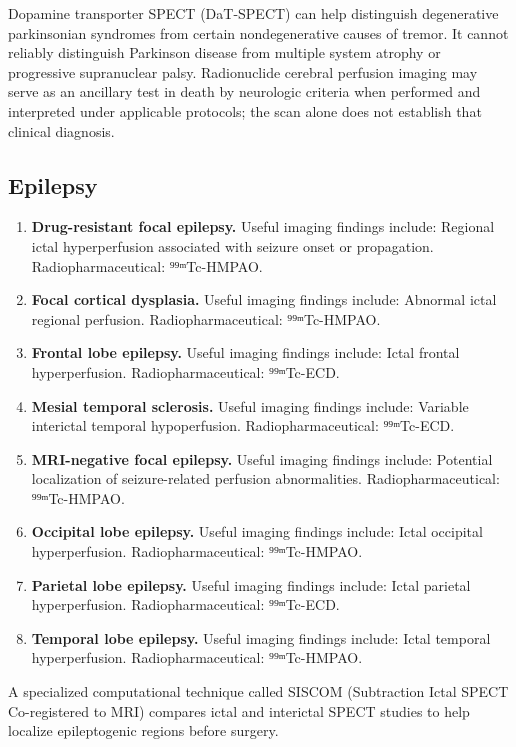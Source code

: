 Dopamine transporter SPECT (DaT-SPECT) can help distinguish degenerative parkinsonian syndromes from certain nondegenerative causes of tremor. It cannot reliably distinguish Parkinson disease from multiple system atrophy or progressive supranuclear palsy.
Radionuclide cerebral perfusion imaging may serve as an ancillary test in death by neurologic criteria when performed and interpreted under applicable protocols; the scan alone does not establish that clinical diagnosis.

\subsection{Epilepsy}
\begin{enumerate}[leftmargin=*,itemsep=0.45em,topsep=0.4em]
\item \textbf{Drug-resistant focal epilepsy.} Useful imaging findings include: Regional ictal hyperperfusion associated with seizure onset or propagation. Radiopharmaceutical: ⁹⁹ᵐTc-HMPAO.
\item \textbf{Focal cortical dysplasia.} Useful imaging findings include: Abnormal ictal regional perfusion. Radiopharmaceutical: ⁹⁹ᵐTc-HMPAO.
\item \textbf{Frontal lobe epilepsy.} Useful imaging findings include: Ictal frontal hyperperfusion. Radiopharmaceutical: ⁹⁹ᵐTc-ECD.
\item \textbf{Mesial temporal sclerosis.} Useful imaging findings include: Variable interictal temporal hypoperfusion. Radiopharmaceutical: ⁹⁹ᵐTc-ECD.
\item \textbf{MRI-negative focal epilepsy.} Useful imaging findings include: Potential localization of seizure-related perfusion abnormalities. Radiopharmaceutical: ⁹⁹ᵐTc-HMPAO.
\item \textbf{Occipital lobe epilepsy.} Useful imaging findings include: Ictal occipital hyperperfusion. Radiopharmaceutical: ⁹⁹ᵐTc-HMPAO.
\item \textbf{Parietal lobe epilepsy.} Useful imaging findings include: Ictal parietal hyperperfusion. Radiopharmaceutical: ⁹⁹ᵐTc-ECD.
\item \textbf{Temporal lobe epilepsy.} Useful imaging findings include: Ictal temporal hyperperfusion. Radiopharmaceutical: ⁹⁹ᵐTc-HMPAO.
\end{enumerate}
A specialized computational technique called SISCOM (Subtraction Ictal SPECT Co-registered to MRI) compares ictal and interictal SPECT studies to help localize epileptogenic regions before surgery.

